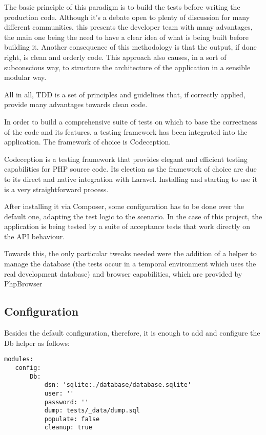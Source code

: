 The basic principle of this paradigm is to build the tests before writing the production code. Although it’s a debate open to plenty of discussion for many different communities, this presents the developer team with many advantages, the main one being the need to have a clear idea of what is being built before building it. Another consequence of this methodology is that the output, if done right, is clean and orderly code. This approach also causes, in a sort of subconscious way, to structure the architecture of the application in a sensible modular way. 

All in all, TDD is a set of principles and guidelines that, if correctly applied, provide many advantages towards clean code.

In order to build a comprehensive suite of tests on which to base the correctness of the code and its features, a testing framework has been integrated into the application.  The framework of choice is Codeception.

Codeception is a testing framework that provides elegant and efficient testing capabilities for PHP source code. Its election as the framework of choice are due to its direct and native integration with Laravel. Installing and starting to use it is a very straightforward process.

After installing it via Composer, some configuration has to be done over the default one, adapting the test logic to the scenario. In the case of this project, the application is being tested by a suite of acceptance tests that work directly on the API behaviour.

Towards this, the only particular tweaks needed were the addition of a helper to manage the database (the tests occur in a temporal environment which uses the real development database) and browser capabilities, which are provided by PhpBrowser

\subsection{Configuration}
Besides the default configuration, therefore, it is enough to add and configure the Db helper as follows:

\begin{verbatim}
modules:
   config:
       Db:
           dsn: 'sqlite:./database/database.sqlite'
           user: ''
           password: ''
           dump: tests/_data/dump.sql
           populate: false
           cleanup: true
\end{verbatim}

